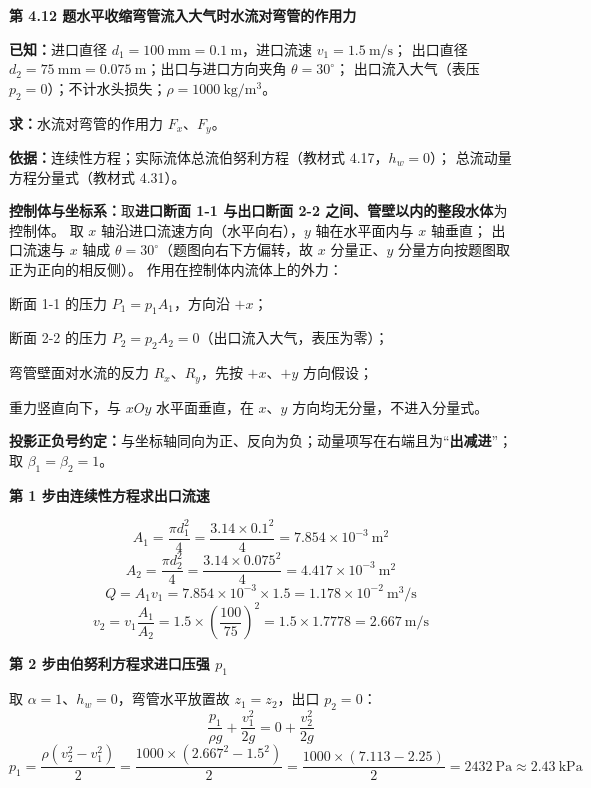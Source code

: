 \noindent\textbf{第 4.12 题\quad 水平收缩弯管流入大气时水流对弯管的作用力}

\begin{jie}
\textbf{已知：}进口直径 $d_1=100\ \mathrm{mm}=0.1\ \mathrm{m}$，进口流速 $v_1=1.5\ \mathrm{m/s}$；
出口直径 $d_2=75\ \mathrm{mm}=0.075\ \mathrm{m}$；出口与进口方向夹角 $\theta=30^\circ$；
出口流入大气（表压 $p_2=0$）；不计水头损失；$\rho=1000\ \mathrm{kg/m^3}$。

\textbf{求：}水流对弯管的作用力 $F_x$、$F_y$。

\textbf{依据：}连续性方程；实际流体总流伯努利方程（教材式 4.17，$h_w=0$）；
总流动量方程分量式（教材式 4.31）。

\textbf{控制体与坐标系：}取\textbf{进口断面 1-1 与出口断面 2-2 之间、管壁以内的整段水体}为控制体。
取 $x$ 轴沿进口流速方向（水平向右），$y$ 轴在水平面内与 $x$ 轴垂直；
出口流速与 $x$ 轴成 $\theta=30^\circ$（题图向右下方偏转，故 $x$ 分量正、$y$ 分量方向按题图取正为正向的相反侧）。
作用在控制体内流体上的外力：
\begin{xiaowen}
\item 断面 1-1 的压力 $P_1=p_1A_1$，方向沿 $+x$；
\item 断面 2-2 的压力 $P_2=p_2A_2=0$（出口流入大气，表压为零）；
\item 弯管壁面对水流的反力 $R_x$、$R_y$，先按 $+x$、$+y$ 方向假设；
\item 重力竖直向下，与 $xOy$ 水平面垂直，在 $x$、$y$ 方向均无分量，不进入分量式。
\end{xiaowen}
\textbf{投影正负号约定：}与坐标轴同向为正、反向为负；动量项写在右端且为“\textbf{出减进}”；
取 $\beta_1=\beta_2=1$。

\textbf{第 1 步\quad 由连续性方程求出口流速}

\[ A_1=\frac{\pi d_1^2}{4}=\frac{3.14\times0.1^2}{4}=7.854\times10^{-3}\ \mathrm{m^2} \]
\[ A_2=\frac{\pi d_2^2}{4}=\frac{3.14\times0.075^2}{4}=4.417\times10^{-3}\ \mathrm{m^2} \]
\[ Q=A_1v_1=7.854\times10^{-3}\times1.5=1.178\times10^{-2}\ \mathrm{m^3/s} \]
\[ v_2=v_1\frac{A_1}{A_2}=1.5\times\left(\frac{100}{75}\right)^2=1.5\times1.7778=2.667\ \mathrm{m/s} \]

\textbf{第 2 步\quad 由伯努利方程求进口压强 $p_1$}

取 $\alpha=1$、$h_w=0$，弯管水平放置故 $z_1=z_2$，出口 $p_2=0$：
\[ \frac{p_1}{\rho g}+\frac{v_1^2}{2g}=0+\frac{v_2^2}{2g} \]
\[ p_1=\frac{\rho\left(v_2^2-v_1^2\right)}{2}
   =\frac{1000\times\left(2.667^2-1.5^2\right)}{2}
   =\frac{1000\times(7.113-2.25)}{2}=2432\ \mathrm{Pa}\approx2.43\ \mathrm{kPa} \]


\end{jie}
